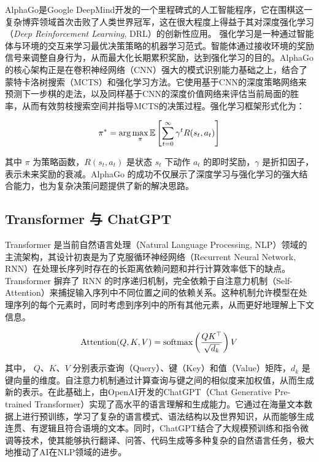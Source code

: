 \documentclass[UTF8,openany,zihao=5]{ctexbook}
\begin{document}
AlphaGo\cite{silver2016mastering}是Google DeepMind开发的一个里程碑式的人工智能程序，它在围棋这一复杂博弈领域首次击败了人类世界冠军，这在很大程度上得益于其对深度强化学习（\textit{Deep Reinforcement Learning}, DRL）的创新性应用。 强化学习是一种通过智能体与环境的交互来学习最优决策策略的机器学习范式。智能体通过接收环境的奖励信号来调整自身行为，从而最大化长期累积奖励，达到强化学习的目的。AlphaGo的核心架构正是在卷积神经网络（CNN）强大的模式识别能力基础之上，结合了蒙特卡洛树搜索（MCTS）和强化学习方法。它使用基于CNN的深度策略网络来预测下一步棋的走法，以及同样基于CNN的深度价值网络来评估当前局面的胜率，从而有效剪枝搜索空间并指导MCTS的决策过程。强化学习框架形式化为：

\begin{equation}\vspace{-4ex}
\pi^* = \arg\max_\pi \mathbb{E} \left[ \sum_{t=0}^{\infty} \gamma^t R(s_t, a_t) \right]
\end{equation}\vspace{-1ex}

其中 $\pi$ 为策略函数，$R(s_t, a_t)$ 是状态 $s_t$ 下动作 $a_t$ 的即时奖励，$\gamma$ 是折扣因子，表示未来奖励的衰减。AlphaGo 的成功不仅展示了深度学习与强化学习的强大结合能力，也为复杂决策问题提供了新的解决思路。

\subsection{Transformer 与 ChatGPT}

Transformer\cite{vaswani2017attention} 是当前自然语言处理（Natural Language Processing, NLP）领域的主流架构，其设计初衷是为了克服循环神经网络（Recurrent Neural Network\cite{jordan1997serial}, RNN）在处理长序列时存在的长距离依赖问题和并行计算效率低下的缺点。 Transformer 摒弃了 RNN 的时序递归机制，完全依赖于自注意力机制（Self-Attention）来捕捉输入序列中不同位置之间的依赖关系。这种机制允许模型在处理序列的每个元素时，同时考虑到序列中的所有其他元素，从而更好地理解上下文信息。

\begin{equation}\vspace{-3ex}
\text{Attention}(Q, K, V) = \text{softmax}\left( \frac{QK^\top}{\sqrt{d_k}} \right) V
\end{equation}\vspace{-1ex}

其中， $Q$、$K$、$V$ 分别表示查询（Query）、键（Key）和值（Value）矩阵，$d_k$ 是键向量的维度。自注意力机制通过计算查询与键之间的相似度来加权值，从而生成新的表示。在此基础上，由OpenAI开发的ChatGPT（Chat Generative Pre-trained Transformer）实现了高水平的语言理解和生成能力。它通过在海量文本数据上进行预训练，学习了复杂的语言模式、语法结构以及世界知识，从而能够生成连贯、有逻辑且符合语境的文本。同时，ChatGPT结合了大规模预训练和指令微调等技术，使其能够执行翻译、问答、代码生成等多种复杂的自然语言任务，极大地推动了AI在NLP领域的进步。
\end{document}
